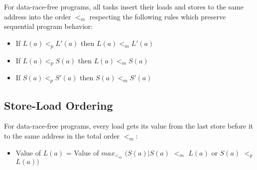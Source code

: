 For data-race-free programs, all tasks insert their loads and stores to the
same address into the order $<_m$ respecting the following rules which preserve
sequential program behavior:

\begin{itemize}
  \item If $L(a) <_p L'(a)$ then $L(a) <_m L'(a)$
  \item If $L(a) <_p S(a)$ then $L(a) <_m S(a)$
  \item If $S(a) <_p S'(a)$ then $S(a) <_m S'(a)$
\end{itemize}

\subsection{Store-Load Ordering}
\label{store_load_program_order}

For data-race-free programs, every load gets its value from the last store before it to the same address in the total order $<_m$:
\begin{itemize}
  \item Value of $L(a)$ = Value of $max_{<_m}$ $( S(a)|S(a)$ $<_m$ $L(a)$ or $S(a)$ $<_p$ $L(a) )$
\end{itemize}

%
%
%
% 


